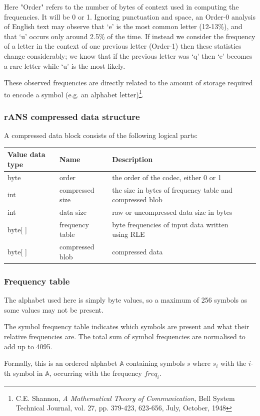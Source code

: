 \documentclass[a4paper]{article}
\begin{document}
Here "Order" refers to the number of bytes of context used in
computing the frequencies. It will be 0 or 1.  Ignoring punctuation
and space, an Order-0 analysis of English text may observe that `e' is
the most common letter (12-13\%), and that `u' occurs only around 2.5\%
of the time.  If instead we consider the frequency of a letter in the
context of one previous letter (Order-1) then these statistics change
considerably;  we know that if the previous letter was `q' then `e'
becomes a rare letter while `u' is the most likely.

These observed frequencies are directly related to the amount of
storage required to encode a symbol (e.g. an alphabet
letter)\footnote{ C.E. Shannon, \textit{A Mathematical Theory of
    Communication}, Bell System Technical Journal, vol. 27,
    pp. 379-423, 623-656, July, October, 1948}.


\subsubsection{\textbf{rANS compressed data structure}}
A compressed data block consists of the following logical parts: 


\begin{tabular}{|l|l|>{\raggedright}p{100pt}|>{\raggedright}p{220pt}|}
\hline
\textbf{Value data type} & \textbf{Name} & \textbf{Description}\tabularnewline
\hline
byte & order & the order of the codec, either 0 or 1\tabularnewline
\hline
int & compressed size & the size in bytes of frequency table and compressed blob\tabularnewline
\hline
int & data size & raw or uncompressed data size in bytes\tabularnewline
\hline
byte[ ] & frequency table & byte frequencies of input data written using RLE\tabularnewline
\hline
byte[ ] & compressed blob & compressed data\tabularnewline
\hline
\end{tabular}

\subsubsection{\textbf{Frequency table}}

The alphabet used here is simply byte values, so a maximum of 256
symbols as some values may not be present.

The symbol frequency table indicates which symbols are present and
what their relative frequencies are.  The total sum of symbol
frequencies are normalised to add up to 4095.

Formally, this is an ordered alphabet $\mathbb{A}$ containing symbols $s$ where
$s_{i}$ with the $i$-th symbol in $\mathbb{A}$, occurring with the frequency $freq_{i}$.
\end{document}
